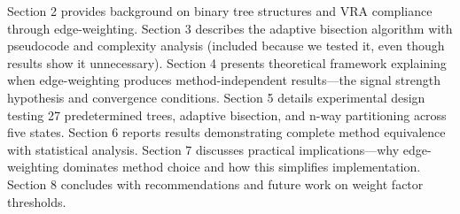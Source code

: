 Section 2 provides background on binary tree structures and VRA compliance through edge-weighting. Section 3 describes the adaptive bisection algorithm with pseudocode and complexity analysis (included because we tested it, even though results show it unnecessary). Section 4 presents theoretical framework explaining when edge-weighting produces method-independent results—the signal strength hypothesis and convergence conditions. Section 5 details experimental design testing 27 predetermined trees, adaptive bisection, and n-way partitioning across five states. Section 6 reports results demonstrating complete method equivalence with statistical analysis. Section 7 discusses practical implications—why edge-weighting dominates method choice and how this simplifies implementation. Section 8 concludes with recommendations and future work on weight factor thresholds.
